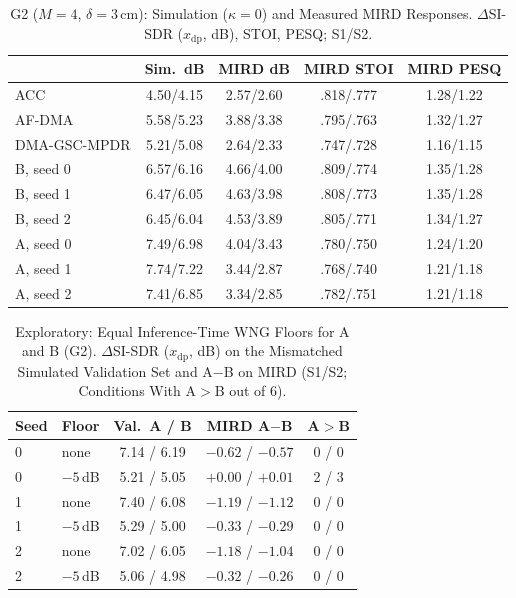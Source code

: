 \documentclass[journal]{IEEEtran}
\begin{document}
\begin{table}[!t]
\centering
\caption{G2 ($M{=}4$, $\delta{=}3$\,cm): Simulation ($\kappa{=}0$) and Measured MIRD Responses. $\Delta$SI-SDR ($x_{\mathrm{dp}}$, dB), STOI, PESQ; S1/S2.}
\label{tab:g2}
\vspace{-4pt}
\footnotesize
\setlength{\tabcolsep}{2.4pt}
\begin{tabular}{@{}lcccc@{}}
\toprule
 & Sim.\ dB & MIRD dB & MIRD STOI & MIRD PESQ \\
\midrule
ACC & 4.50/4.15 & 2.57/2.60 & .818/.777 & 1.28/1.22 \\
AF-DMA & 5.58/5.23 & 3.88/3.38 & .795/.763 & 1.32/1.27 \\
DMA-GSC-MPDR & 5.21/5.08 & 2.64/2.33 & .747/.728 & 1.16/1.15 \\
\midrule
B, seed 0 & 6.57/6.16 & 4.66/4.00 & .809/.774 & 1.35/1.28 \\
B, seed 1 & 6.47/6.05 & 4.63/3.98 & .808/.773 & 1.35/1.28 \\
B, seed 2 & 6.45/6.04 & 4.53/3.89 & .805/.771 & 1.34/1.27 \\
A, seed 0 & 7.49/6.98 & 4.04/3.43 & .780/.750 & 1.24/1.20 \\
A, seed 1 & 7.74/7.22 & 3.44/2.87 & .768/.740 & 1.21/1.18 \\
A, seed 2 & 7.41/6.85 & 3.34/2.85 & .782/.751 & 1.21/1.18 \\
\bottomrule
\end{tabular}
\vspace{-10pt}
\end{table}

\begin{table}[!t]
\centering
\caption{Exploratory: Equal Inference-Time WNG Floors for A and B (G2). $\Delta$SI-SDR ($x_{\mathrm{dp}}$, dB) on the Mismatched Simulated Validation Set and A$-$B on MIRD (S1/S2; Conditions With A$>$B out of 6).}
\label{tab:floor}
\vspace{-4pt}
\footnotesize
\setlength{\tabcolsep}{3pt}
\begin{tabular}{@{}llccc@{}}
\toprule
Seed & Floor & Val.\ A / B & MIRD A$-$B & A$>$B \\
\midrule
0 & none & 7.14 / 6.19 & $-0.62$ / $-0.57$ & 0 / 0 \\
0 & $-5$\,dB & 5.21 / 5.05 & $+0.00$ / $+0.01$ & 2 / 3 \\
1 & none & 7.40 / 6.08 & $-1.19$ / $-1.12$ & 0 / 0 \\
1 & $-5$\,dB & 5.29 / 5.00 & $-0.33$ / $-0.29$ & 0 / 0 \\
2 & none & 7.02 / 6.05 & $-1.18$ / $-1.04$ & 0 / 0 \\
2 & $-5$\,dB & 5.06 / 4.98 & $-0.32$ / $-0.26$ & 0 / 0 \\
\bottomrule
\end{tabular}
\vspace{-10pt}
\end{table}
\end{document}

